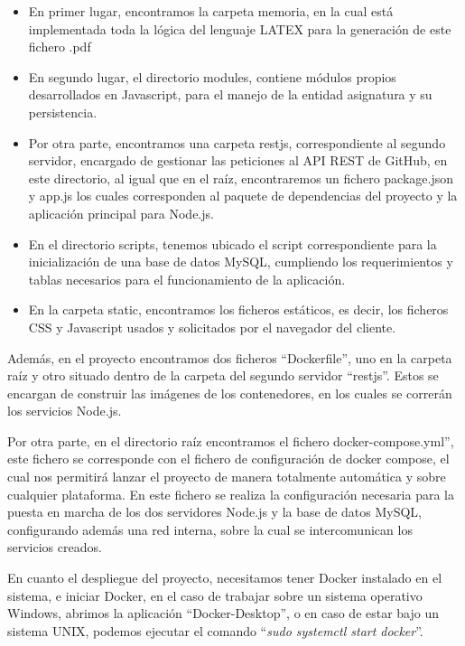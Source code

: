 \begin{itemize}
  \item En primer lugar, encontramos la carpeta memoria, en la cual está implementada toda la lógica del lenguaje LATEX para la generación de este fichero .pdf
  
  \item En segundo lugar, el directorio modules, contiene módulos propios desarrollados en Javascript, para el manejo de la entidad asignatura y su persistencia.
  
  \item Por otra parte, encontramos una carpeta restjs, correspondiente al segundo servidor, encargado de gestionar las peticiones al API REST de GitHub, en este directorio, al igual que en el raíz, encontraremos un fichero package.json y app.js los cuales corresponden al paquete de dependencias del proyecto y la aplicación principal para Node.js.
  
  \item En el directorio scripts, tenemos ubicado el script correspondiente para la inicialización de una base de datos MySQL, cumpliendo los requerimientos y tablas necesarios para el funcionamiento de la aplicación.
  
  \item En la carpeta static, encontramos los ficheros estáticos, es decir, los ficheros CSS y Javascript usados y solicitados por el navegador del cliente.
\end{itemize}

Además, en el proyecto encontramos dos ficheros ``Dockerfile'', uno en la carpeta raíz y otro situado dentro de la carpeta del segundo servidor ``restjs''. Estos se encargan de construir las imágenes de los contenedores, en los cuales se correrán los servicios Node.js.

Por otra parte, en el directorio raíz encontramos el fichero docker-compose.yml'', este fichero se corresponde con el fichero de configuración de docker compose, el cual nos permitirá lanzar el proyecto de manera totalmente automática y sobre cualquier plataforma. En este fichero se realiza la configuración necesaria para la puesta en marcha de los dos servidores Node.js y la base de datos MySQL, configurando además una red interna, sobre la cual se intercomunican los servicios creados.

En cuanto el despliegue del proyecto, necesitamos tener Docker instalado en el sistema, e iniciar Docker, en el caso de trabajar sobre un sistema operativo Windows, abrimos la aplicación ``Docker-Desktop''\cite{DockerDesktop}, o en caso de estar bajo un sistema UNIX, podemos ejecutar el comando ``\emph{sudo systemctl start docker}''.


